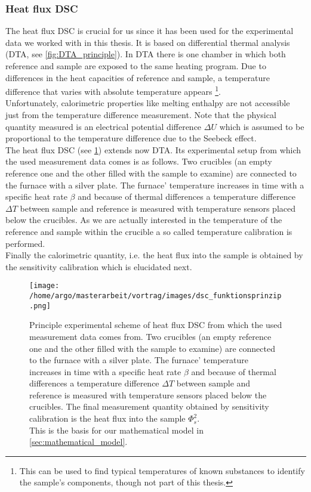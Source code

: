\documentclass{scrartcl}[12pt, halfparskip]
\numberwithin{equation}{section}
\numberwithin{figure}{section}
\numberwithin{table}{section}
\begin{document}
\subsubsection{Heat flux DSC}
\label{sec:heat_flux_dsc}
The heat flux DSC is crucial for us since it has been used for the experimental data we worked with in this thesis. It is based on differential thermal analysis (DTA, see \cref{fig:DTA_principle}). 
In DTA there is one chamber in which both reference and sample are exposed to the same heating program.
Due to differences in the heat capacities of reference and sample, a temperature difference that varies with absolute temperature appears \footnote{This can be used to find typical temperatures of known substances to identify the sample's components, though not part of this thesis.}. \\
Unfortunately, calorimetric properties like melting enthalpy are not accessible just from the temperature difference measurement. 
Note that the physical quantity measured is an electrical potential difference $\Delta U$ which is assumed to be proportional to the temperature difference due to the Seebeck effect. \\
The heat flux DSC (see \cref{fig:heat_flux_DSC}) extends now DTA. Its experimental setup from which the used measurement data comes is as follows. Two crucibles (an empty reference one and the other filled with the sample to examine) are connected to the furnace with a silver plate. The furnace' temperature increases in time with a specific heat rate $\beta$ and because of thermal differences a temperature difference $\Delta T$ between sample and reference is measured with temperature sensors placed below the crucibles. As we are actually interested in the temperature of the reference and sample within the crucible a so called temperature calibration is performed. \\
Finally the calorimetric quantity, i.e. the heat flux into the sample is obtained by the sensitivity calibration which is elucidated next.


\begin{figure}[h]
	\vspace{-1cm}
	\centering
	\texttt{[image: /home/argo/masterarbeit/vortrag/images/dsc\_funktionsprinzip.png]}
	\caption{Principle experimental scheme of heat flux DSC from which the used measurement data comes from. Two crucibles (an empty reference one and the other filled with the sample to examine) are connected to the furnace with a silver plate. The furnace' temperature increases in time with a specific heat rate $\beta$ and because of thermal differences a temperature difference $\Delta T$ between sample and reference is measured with temperature sensors placed below the crucibles. The final measurement quantity obtained by sensitivity calibration is the heat flux into the sample $\varPhi_s^2$. \\
	This is the basis for our mathematical model in \cref{sec:mathematical_model}.}
	\label{fig:heat_flux_DSC}
\end{figure}
\end{document}
